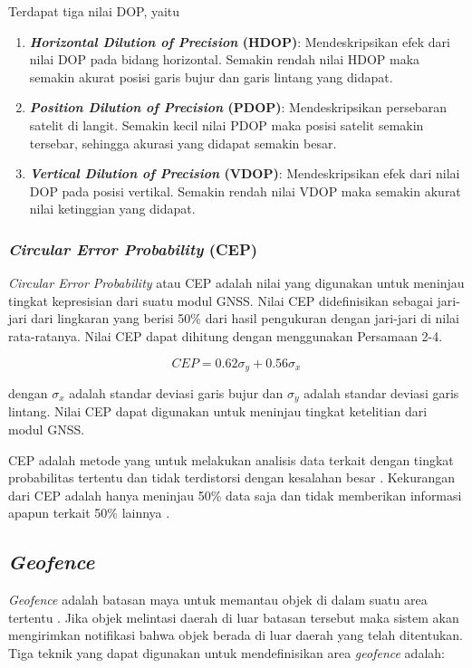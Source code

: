 Terdapat tiga nilai DOP, yaitu
\begin{enumerate}
	\item \textbf{\textit{Horizontal Dilution of Precision} (HDOP)}: Mendeskripsikan efek dari nilai DOP pada bidang horizontal. Semakin rendah nilai HDOP maka semakin akurat posisi garis bujur dan garis lintang yang didapat.
	\item \textbf{\textit{Position Dilution of Precision} (PDOP)}: Mendeskripsikan persebaran satelit di langit. Semakin kecil nilai PDOP maka posisi satelit semakin tersebar, sehingga akurasi yang didapat semakin besar.
	\item \textbf{\textit{Vertical Dilution of Precision} (VDOP)}: Mendeskripsikan efek dari nilai DOP pada posisi vertikal. Semakin rendah nilai VDOP maka semakin akurat nilai ketinggian yang didapat.
\end{enumerate}

\subsubsection{\textit{Circular Error Probability} (CEP)}
\textit{Circular Error Probability} atau CEP adalah nilai yang digunakan untuk meninjau tingkat kepresisian dari suatu modul GNSS. Nilai CEP didefinisikan sebagai jari-jari dari lingkaran yang berisi 50\% dari hasil pengukuran dengan jari-jari di nilai rata-ratanya. Nilai CEP dapat dihitung dengan menggunakan Persamaan 2-4.

\begin{equation}
CEP = 0.62 \sigma_y + 0.56 \sigma_x
\label{eq:2-4}
\end{equation}

dengan $\sigma_x$ adalah standar deviasi garis bujur dan $\sigma_y$ adalah standar deviasi garis lintang. Nilai CEP dapat digunakan untuk meninjau tingkat ketelitian dari modul GNSS.

CEP adalah metode yang untuk melakukan analisis data terkait dengan tingkat probabilitas tertentu dan tidak terdistorsi dengan kesalahan besar \cite{Chin1983}. Kekurangan dari CEP adalah hanya meninjau 50\% data saja dan tidak memberikan informasi apapun terkait 50\% lainnya \cite{Sathish2016}.

\subsection{\textit{Geofence}}
\textit{Geofence} adalah batasan maya untuk memantau objek di dalam suatu area tertentu \cite{Sari2021}. Jika objek melintasi daerah di luar batasan tersebut maka sistem akan mengirimkan notifikasi bahwa objek berada di luar daerah yang telah ditentukan. Tiga teknik yang dapat digunakan untuk mendefinisikan area \textit{geofence} \cite{Rui2015} adalah:

